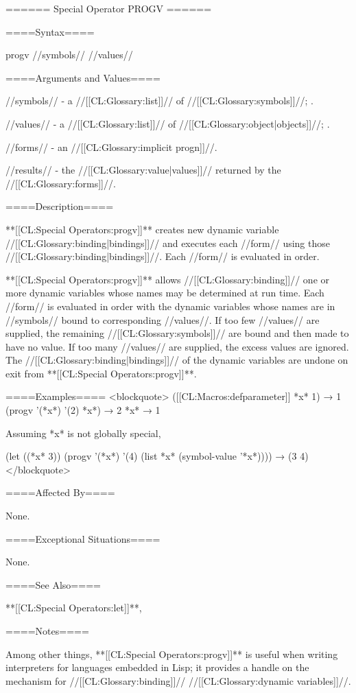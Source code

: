 ====== Special Operator PROGV ======

====Syntax====

\DefspecWithValues progv {//symbols// //values// } {}

====Arguments and Values====

//symbols// - a //[[CL:Glossary:list]]// of //[[CL:Glossary:symbols]]//; \eval.

//values// - a //[[CL:Glossary:list]]// of //[[CL:Glossary:object|objects]]//; \eval.

//forms// - an //[[CL:Glossary:implicit progn]]//.

//results// - the //[[CL:Glossary:value|values]]// returned by the //[[CL:Glossary:forms]]//.

====Description====

**[[CL:Special Operators:progv]]** creates new dynamic variable //[[CL:Glossary:binding|bindings]]// and executes each //form// using those //[[CL:Glossary:binding|bindings]]//. Each //form// is evaluated in order.

**[[CL:Special Operators:progv]]** allows //[[CL:Glossary:binding]]// one or more dynamic variables whose names may be determined at run time. Each //form// is evaluated in order with the dynamic variables whose names are in //symbols// bound to corresponding //values//. If too few //values// are supplied, the remaining //[[CL:Glossary:symbols]]// are bound and then made to have no value. If too many //values// are supplied, the excess values are ignored. The //[[CL:Glossary:binding|bindings]]// of the dynamic variables are undone on exit from **[[CL:Special Operators:progv]]**.

====Examples==== <blockquote> ([[CL:Macros:defparameter]] *x* 1) → 1 (progv '(*x*) '(2) *x*) → 2 *x* → 1

Assuming *x* is not globally special,

(let ((*x* 3)) (progv '(*x*) '(4) (list *x* (symbol-value '*x*)))) → (3 4) </blockquote>

====Affected By====

None.

====Exceptional Situations====

None.

====See Also====

**[[CL:Special Operators:let]]**, {\secref\Evaluation}

====Notes====

Among other things, **[[CL:Special Operators:progv]]** is useful when writing interpreters for languages embedded in Lisp; it provides a handle on the mechanism for //[[CL:Glossary:binding]]// //[[CL:Glossary:dynamic variables]]//.

